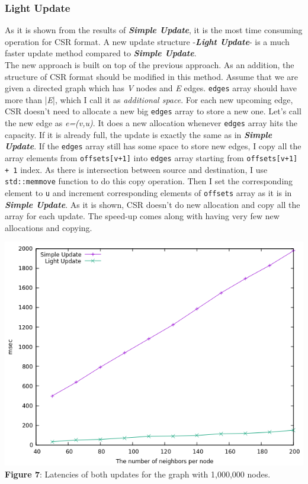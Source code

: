 \documentclass{article}
\begin{document}
 \subsubsection*{Light Update}
 As it is shown from the results of \textbf{\textit{Simple Update}}, it is the most time consuming operation for CSR format. A new update structure -\textbf{\textit{Light Update}}- is a much faster update method compared to \textbf{\textit{Simple Update}}.\\
 The new approach is built on top of the previous approach. As an addition, the structure of CSR format should be modified in this method. Assume that we are given a directed graph which has \textit{V} nodes and \textit{E} edges. \texttt{edges} array should have more than |\textit{E}|, which I call it as \textit{additional space}. For each new upcoming edge, CSR doesn't need to allocate a new big \texttt{edges} array to store a new one. Let's call the new edge as \textit{e=(v,u)}. It does a new allocation whenever \texttt{edges} array hits the capacity. If it is already full, the update is exactly the same as in \textbf{\textit{Simple Update}}. If the \texttt{edges} array still has some space to store new edges, I copy all the array elements from \texttt{offsets[v+1]} into \texttt{edges} array starting from \texttt{offsets[v+1] + 1} index. As there is intersection between source and destination, I use \texttt{std::memmove} function to do this copy operation. Then I set the corresponding element to \texttt{u} and increment corresponding elements of \texttt{offsets} array as it is in \textbf{\textit{Simple Update}}. As it is shown, CSR doesn't do new allocation and copy all the array for each update. The speed-up comes along with having very few new allocations and copying.\\
\begin{center}
\includegraphics[scale = 0.5]{time_per_update}\\
\textbf{Figure 7}: Latencies of both updates for the graph with 1,000,000 nodes.
\end{center}
\end{document}
